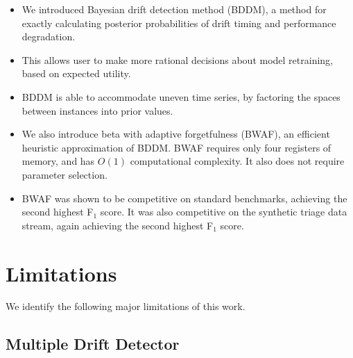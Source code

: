 \begin{itemize}
  \item We introduced Bayesian drift detection method (BDDM), a method for exactly calculating posterior probabilities of drift timing and performance degradation. 
  \item This allows user to make more rational decisions about model retraining, based on expected utility. 
  \item BDDM is able to accommodate uneven time series, by factoring the spaces between instances into prior values.
  \item We also introduce beta with adaptive forgetfulness (BWAF), an efficient heuristic approximation of BDDM. BWAF requires only four registers of memory, and has $O(1)$ computational complexity. It also does not require parameter selection. 
  \item BWAF was shown to be competitive on standard benchmarks, achieving the second highest F$_1$ score. It was also competitive on the synthetic triage data stream, again achieving the second highest F$_1$ score.
\end{itemize}


\section{Limitations} \label{conclusions:limitations}

We identify the following major limitations of this work.

\subsection{Multiple Drift Detector}


